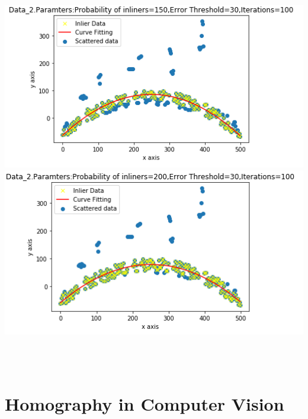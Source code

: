 \documentclass{article}
\begin{document}
\begin{center}
    \includegraphics{Data_2_Parameter_2.PNG}
    \includegraphics{Data_2_Parameter_3.PNG}
\end{center}
\\
\\
\vspace{40mm} %
\section{Homography in Computer Vision}
\end{document}
